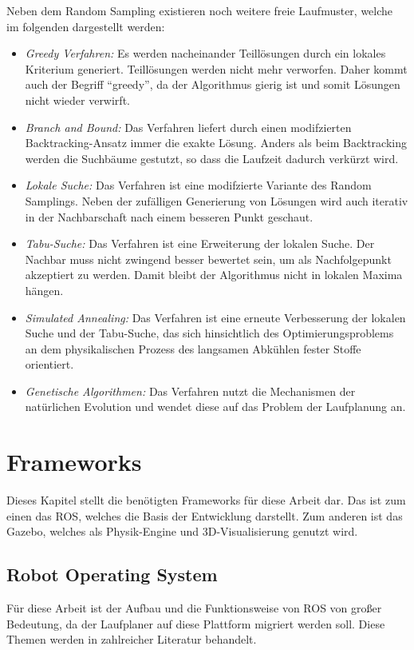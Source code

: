 Neben dem Random Sampling existieren noch weitere freie Laufmuster, welche im folgenden dargestellt werden:
\begin{itemize}
  \item \emph{Greedy Verfahren:} Es werden nacheinander Teillösungen durch ein lokales Kriterium generiert. Teillösungen werden nicht mehr verworfen. Daher kommt auch der Begriff "`greedy"', da der Algorithmus gierig ist und somit Lösungen nicht wieder verwirft.
  \item \emph{Branch and Bound:} Das Verfahren liefert durch einen modifzierten Backtracking-Ansatz immer die exakte Lösung. Anders als beim Backtracking werden die Suchbäume gestutzt, so dass die Laufzeit dadurch verkürzt wird.
  \item \emph{Lokale Suche:} Das Verfahren ist eine modifzierte Variante des Random Samplings. Neben der zufälligen Generierung von Lösungen wird auch iterativ in der Nachbarschaft nach einem besseren Punkt geschaut.
  \item \emph{Tabu-Suche:} Das Verfahren ist eine Erweiterung der lokalen Suche. Der Nachbar muss nicht zwingend besser bewertet sein, um als Nachfolgepunkt akzeptiert zu werden. Damit bleibt der Algorithmus nicht in lokalen Maxima hängen.
  \item \emph{Simulated Annealing:} Das Verfahren ist eine erneute Verbesserung der lokalen Suche und der Tabu-Suche, das sich hinsichtlich des Optimierungsproblems an dem physikalischen Prozess des langsamen Abkühlen fester Stoffe orientiert.
  \item \emph{Genetische Algorithmen:} Das Verfahren nutzt die Mechanismen der natürlichen Evolution und wendet diese auf das Problem der Laufplanung an.
\end{itemize}

\section{Frameworks}

Dieses Kapitel stellt die benötigten Frameworks für diese Arbeit dar. Das ist zum einen das \ac{ROS}, welches die Basis der Entwicklung darstellt. Zum anderen ist das Gazebo, welches als Physik-Engine und 3D-Visualisierung genutzt wird.

\subsection{Robot Operating System}

Für diese Arbeit ist der Aufbau und die Funktionsweise von \ac{ROS} von großer Bedeutung, da der Laufplaner auf diese Plattform migriert werden soll. Diese Themen werden in zahlreicher Literatur behandelt. \autocite{rosAnOpenSourceRobotOperatingSystem} \autocite{learningROSForRoboticsProgramming} \autocite{gentleIntroductionToROS}

